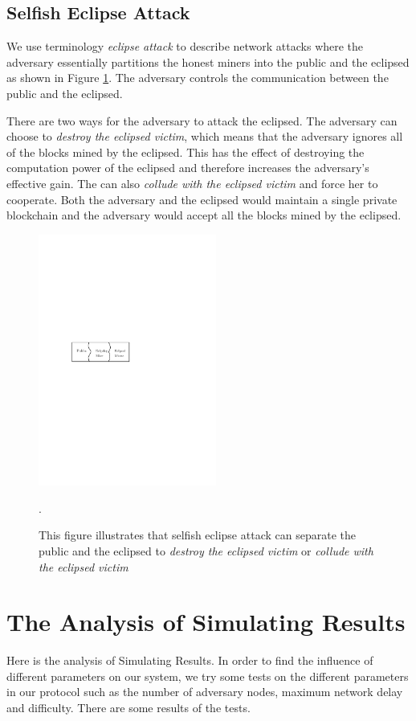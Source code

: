 \documentclass{llncs}
\begin{document}
\subsection{Selfish Eclipse Attack}
\quad We use terminology \emph{eclipse attack} to describe network attacks where the adversary essentially partitions the honest miners into the public and the eclipsed as shown in Figure \ref{eclipsed}. The adversary controls the communication between the public and the eclipsed.

There are two ways for the adversary to attack the eclipsed. The adversary can choose to \emph{destroy the eclipsed victim}, which means that the adversary ignores all of the blocks mined by the eclipsed. This has the effect of destroying the computation power of the eclipsed and therefore increases the adversary's effective gain. The can also \emph{collude with the eclipsed victim} and force her to cooperate. Both the adversary and the eclipsed would maintain a single private blockchain and the adversary would accept all the blocks mined by the eclipsed.

\vspace{-4mm}
\begin{figure}
\centering
\includegraphics[width=2.3in]{Figures/eclipse.pdf}
\vspace{-3mm}
\caption{This figure illustrates that selfish eclipse attack can separate the public and the eclipsed to \emph{destroy the eclipsed victim} or \emph{collude with the eclipsed victim}}. 
\label{eclipsed}
\end{figure}
\section{The Analysis of Simulating Results}
\quad Here is the analysis of Simulating Results. In order to find the influence of different parameters on our system, we try some tests on the different parameters in our protocol such as the number of adversary nodes, maximum network delay and difficulty. There are some results of the tests.
\end{document}
